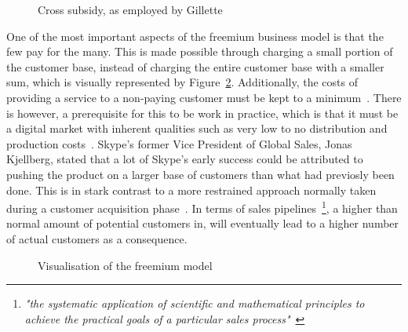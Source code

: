 \begin{figure}
    \centering
    \caption{Cross subsidy, as employed by Gillette~\cite{chrisanderson2008}}
    \label{fig:gillette}
\end{figure}


One of the most important aspects of the freemium business model is that the few pay for the many. This is made possible through charging a small portion of the customer base, instead of charging the entire customer base with a smaller sum, which is visually represented by Figure~\ref{fig:freemium}. Additionally, the costs of providing a service to a non-paying customer must be kept to a minimum~\cite{chrisanderson2008feb}. There is however, a prerequisite for this to be work in practice, which is that it must be a digital market with inherent qualities such as very low to no distribution and production costs~\cite{chrisanderson2008}. Skype's former Vice President of Global Sales, Jonas Kjellberg, stated that a lot of Skype's early success could be attributed to pushing the product on a larger base of customers than what had previosly been done. This is in stark contrast to a more restrained approach normally taken during a customer acquisition phase~\cite{jonaskjellberg2014}. In terms of sales pipelines~\footnote{\textit{"the systematic application of scientific and mathematical principles to achieve the practical goals of a particular sales process"}~\cite{selden1996}}, a higher than normal amount of potential customers in, will eventually lead to a higher number of actual customers as a consequence.

\begin{figure}
    \centering
    \caption{Visualisation of the freemium model~\cite{chrisanderson2008}}
    \label{fig:freemium}
\end{figure}

